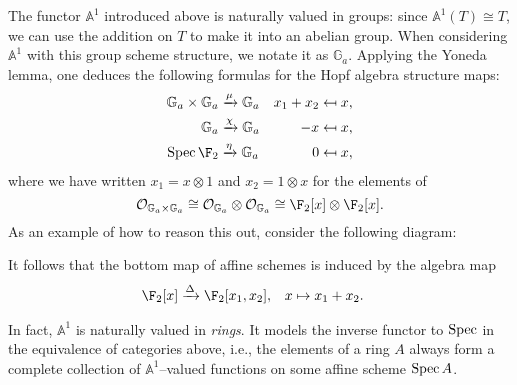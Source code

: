 \begin{example}\label{InformalAdditiveGroupExample}
The functor \(\mathbb A^1\) introduced above is naturally valued in groups: since \(\mathbb A^1(T) \cong T\), we can use the addition on \(T\) to make it into an abelian group.  When considering \(\mathbb A^1\) with this group scheme structure, we notate it as \(\mathbb G_a\).  Applying the Yoneda lemma, one deduces the following formulas for the Hopf algebra structure maps:
\begin{align*}
\mathbb G_a \times \mathbb G_a & \xrightarrow{\mu} \mathbb G_a & x_1 + x_2 & \mapsfrom x, \\
\mathbb G_a & \xrightarrow{\chi} \mathbb G_a & -x & \mapsfrom x, \\
\Spec \F_2 & \xrightarrow{\eta} \mathbb G_a & 0 & \mapsfrom x,
\end{align*}
where we have written \(x_1 = x \otimes 1\) and \(x_2 = 1 \otimes x\) for the elements of \[\sheaf O_{\mathbb G_a \times \mathbb G_a} \cong \sheaf O_{\mathbb G_a} \otimes \sheaf O_{\mathbb G_a} \cong \F_2[x] \otimes \F_2[x].\]  As an example of how to reason this out, consider the following diagram:
\begin{center}
\end{center}
It follows that the bottom map of affine schemes is induced by the algebra map
\begin{align*}
\F_2[x] & \xrightarrow{\Delta} \F_2[x_1, x_2], &
x & \mapsto x_1 + x_2.
\end{align*}
\end{example}

\begin{remark}
In fact, \(\mathbb A^1\) is naturally valued in \emph{rings}. It models the inverse functor to \(\operatorname{Spec}\) in the equivalence of categories above, i.e., the elements of a ring \(A\) always form a complete collection of \(\mathbb A^1\)--valued functions on some affine scheme \(\operatorname{Spec} A\).
\end{remark}

